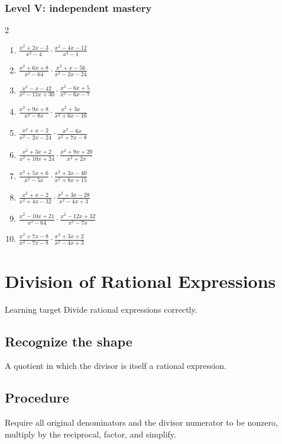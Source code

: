 \documentclass[11pt,oneside]{book}
\begin{document}
\subsection*{Level V: independent mastery}
\begin{multicols}{2}
\begin{enumerate}[leftmargin=*,label=\textbf{\arabic*.},itemsep=0.65\baselineskip]
\item $\displaystyle \frac{x^{2} + 2 x - 3}{x^{2} - 4}\cdot\frac{x^{2} - 4 x - 12}{x^{2} - 1}$
\item $\displaystyle \frac{x^{2} + 6 x + 8}{x^{2} - 64}\cdot\frac{x^{2} + x - 56}{x^{2} - 2 x - 24}$
\item $\displaystyle \frac{x^{2} - x - 42}{x^{2} - 11 x + 30}\cdot\frac{x^{2} - 6 x + 5}{x^{2} - 6 x - 7}$
\item $\displaystyle \frac{x^{2} + 9 x + 8}{x^{2} - 8 x}\cdot\frac{x^{2} + 3 x}{x^{2} + 6 x - 16}$
\item $\displaystyle \frac{x^{2} + x - 2}{x^{2} - 2 x - 24}\cdot\frac{x^{2} - 6 x}{x^{2} + 7 x - 8}$
\item $\displaystyle \frac{x^{2} + 3 x + 2}{x^{2} + 10 x + 24}\cdot\frac{x^{2} + 9 x + 20}{x^{2} + 2 x}$
\item $\displaystyle \frac{x^{2} + 5 x + 6}{x^{2} - 5 x}\cdot\frac{x^{2} + 3 x - 40}{x^{2} + 8 x + 15}$
\item $\displaystyle \frac{x^{2} + x - 2}{x^{2} + 4 x - 32}\cdot\frac{x^{2} + 3 x - 28}{x^{2} - 4 x + 3}$
\item $\displaystyle \frac{x^{2} - 10 x + 21}{x^{2} - 64}\cdot\frac{x^{2} - 12 x + 32}{x^{2} - 7 x}$
\item $\displaystyle \frac{x^{2} + 7 x - 8}{x^{2} - 7 x - 8}\cdot\frac{x^{2} + 3 x + 2}{x^{2} - 4 x + 3}$
\end{enumerate}
\end{multicols}
\chapter{Division of Rational Expressions}
\begin{rulebox}{Learning target}
Divide rational expressions correctly.
\end{rulebox}
\section{Recognize the shape}
A quotient in which the divisor is itself a rational expression.
\section{Procedure}
Require all original denominators and the divisor numerator to be nonzero, multiply by the reciprocal, factor, and simplify.
\end{document}
